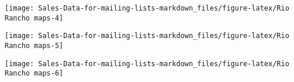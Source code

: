 \documentclass[
]{article}
\begin{document}
\begin{center}\texttt{[image: Sales-Data-for-mailing-lists-markdown\_files/figure-latex/Rio Rancho maps-4]} \end{center}

\begin{center}\texttt{[image: Sales-Data-for-mailing-lists-markdown\_files/figure-latex/Rio Rancho maps-5]} \end{center}

\begin{center}\texttt{[image: Sales-Data-for-mailing-lists-markdown\_files/figure-latex/Rio Rancho maps-6]} \end{center}

\begin{table}


\end{table}
\end{document}
